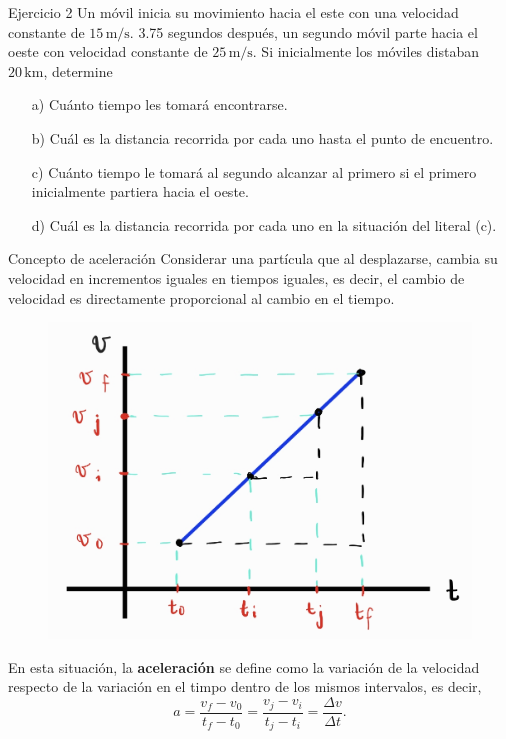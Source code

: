 \begin{frame}{Ejercicio 2}
    Un m\'ovil inicia su movimiento hacia el este con una velocidad constante de $15 \,\text{m/s}$. 3.75 segundos despu\'es, un segundo m\'ovil parte hacia el oeste con velocidad constante de $25 \,\text{m/s}$. Si inicialmente los móviles distaban $20 \,\text{km}$, determine
    
    \begin{itemize}
        \item[a)] Cu\'anto tiempo les tomar\'a encontrarse.
        \item[b)] Cu\'al es la distancia recorrida por cada uno hasta el punto de encuentro.
        \item[c)] Cuánto tiempo le tomará al segundo alcanzar al primero si el primero inicialmente partiera hacia el oeste.
        \item[d)] Cuál es la distancia recorrida por cada uno en la situación del literal (c).
    \end{itemize}
\end{frame}

\begin{frame}{Concepto de aceleración}
    Considerar una partícula que al desplazarse, cambia su velocidad en incrementos iguales en tiempos iguales, es decir, el cambio de velocidad es directamente proporcional al cambio en el tiempo.

    \begin{figure}
        \centering
        \includegraphics[width=0.4\linewidth]{figures/VvsT2.jpg}
    \end{figure}

    En esta situación, la \textbf{aceleración} se define como la variación de la velocidad respecto de la variación en el timpo dentro de los mismos intervalos, es decir, $$a=\frac{v_f-v_0}{t_f-t_0}=\frac{v_j-v_i}{t_j-t_i}=\frac{\Delta v}{\Delta t}.$$
    
\end{frame}

